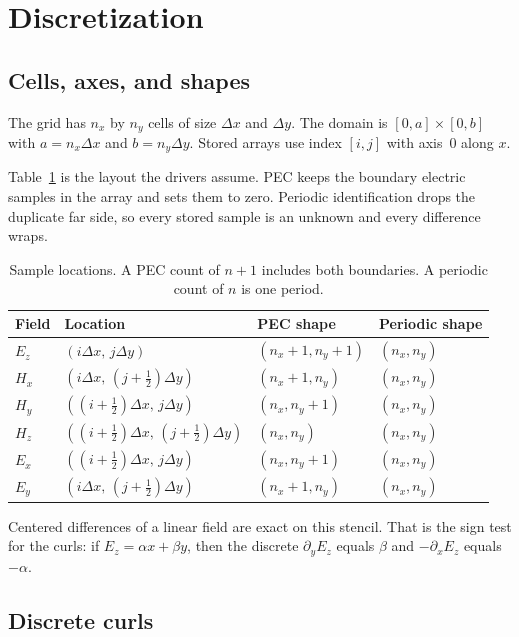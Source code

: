 \documentclass[11pt,a4paper]{article}
\numberwithin{equation}{section}
\begin{document}
\section{Discretization}
\label{sec:discretization}

\subsection{Cells, axes, and shapes}
\label{sec:shapes}

The grid has $n_x$ by $n_y$ cells of size $\Delta x$ and $\Delta y$. The domain
is $[0,a]\times[0,b]$ with $a=n_x\Delta x$ and $b=n_y\Delta y$. Stored arrays
use index $[i,j]$ with axis~0 along $x$.

Table~\ref{tab:shapes} is the layout the drivers assume. PEC keeps the
boundary electric samples in the array and sets them to zero. Periodic
identification drops the duplicate far side, so every stored sample is an
unknown and every difference wraps.

\begin{table}[ht]
\centering
\caption{Sample locations. A PEC count of $n{+}1$ includes both boundaries. A
periodic count of $n$ is one period.}
\label{tab:shapes}
\begin{tabular}{@{}llll@{}}
\toprule
Field & Location & PEC shape & Periodic shape\\
\midrule
$E_z$ & $(i\Delta x,\, j\Delta y)$ & $(n_x{+}1,n_y{+}1)$ & $(n_x,n_y)$\\
$H_x$ & $(i\Delta x,\, (j+\tfrac12)\Delta y)$ & $(n_x{+}1,n_y)$ & $(n_x,n_y)$\\
$H_y$ & $((i+\tfrac12)\Delta x,\, j\Delta y)$ & $(n_x,n_y{+}1)$ & $(n_x,n_y)$\\
\midrule
$H_z$ & $((i+\tfrac12)\Delta x,\, (j+\tfrac12)\Delta y)$ & $(n_x,n_y)$ & $(n_x,n_y)$\\
$E_x$ & $((i+\tfrac12)\Delta x,\, j\Delta y)$ & $(n_x,n_y{+}1)$ & $(n_x,n_y)$\\
$E_y$ & $(i\Delta x,\, (j+\tfrac12)\Delta y)$ & $(n_x{+}1,n_y)$ & $(n_x,n_y)$\\
\bottomrule
\end{tabular}
\end{table}

Centered differences of a linear field are exact on this stencil. That is the
sign test for the curls: if $E_z=\alpha x+\beta y$, then the discrete
$\partial_y E_z$ equals $\beta$ and $-\partial_x E_z$ equals $-\alpha$.

\subsection{Discrete curls}
\label{sec:curls}
\end{document}

